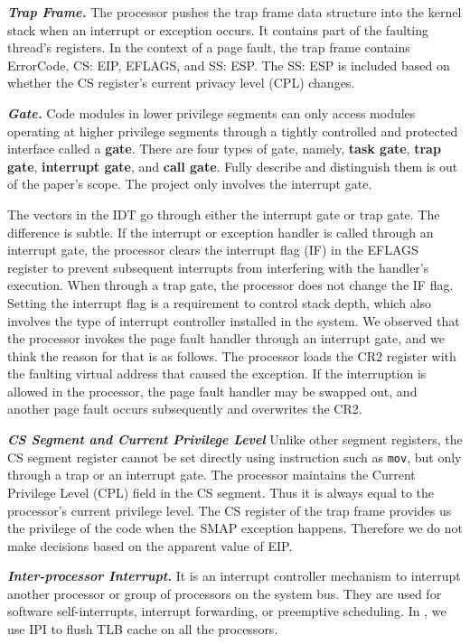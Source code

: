 \textbf{\textit{Trap Frame.}}  The processor pushes the trap frame data structure into the kernel stack when an interrupt or exception occurs.
It contains part of the faulting thread's registers. In the context of a page fault, the trap frame contains ErrorCode, CS: EIP, EFLAGS, and SS: ESP. The SS: ESP is included based on whether the CS register's current privacy level (CPL) changes. 



\textbf{\textit{Gate.}} Code modules in lower privilege segments can only access modules operating at higher privilege segments through a tightly controlled and protected interface called a \textbf{gate}.  There are four types of gate, namely, \textbf{task gate}, \textbf{trap gate}, \textbf{interrupt gate}, and \textbf{call gate}. Fully describe and distinguish them is out of the paper's scope. The project only involves the interrupt gate.

The vectors in the IDT go through either the interrupt gate or trap gate. The difference is subtle. If the interrupt or exception handler is called through an interrupt gate, the processor clears the interrupt flag (IF) in the EFLAGS register to prevent subsequent interrupts from interfering with the handler's execution.  When through a trap gate, the processor does not change the IF flag. Setting the interrupt flag is a requirement to control stack depth, which also involves the type of interrupt controller installed in the system. We observed that the processor invokes the page fault handler through an interrupt gate, and we think the reason for that is as follows. The processor loads the CR2 register with the faulting virtual address that caused the exception. If the interruption is allowed in the processor, the page fault handler may be swapped out, and another page fault occurs subsequently and overwrites the CR2. 



\textbf{\textit{CS Segment and Current Privilege Level}} Unlike other segment registers, the CS segment register cannot be set directly using instruction such as \texttt{mov},  but only through a trap or an interrupt gate.  The processor maintains the Current Privilege Level (CPL) field in the CS segment. Thus it is always equal to the processor's current privilege level. The CS register of the trap frame provides us the privilege of the code when the SMAP exception happens. Therefore we do not make decisions based on the apparent value of EIP.


\textbf{\textit{Inter-processor Interrupt.}}  It is an interrupt controller mechanism to interrupt another processor or group of processors on the system bus. They are used for software self-interrupts, interrupt forwarding, or preemptive scheduling. In \name, we use IPI to flush TLB cache on all the processors.

